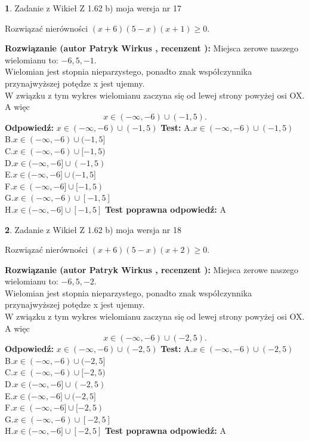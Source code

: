 \documentclass[12pt, a4paper]{article}
\theoremstyle{definition} %
\newtheorem{zad}{}
\newcommand{\zadStart}[1]{\begin{zad}#1\newline}
\newcommand{\zadStop}{\end{zad}}
\newcommand{\rozwStart}[2]{\noindent \textbf{Rozwiązanie (autor #1 , recenzent #2): }\newline}
\newcommand{\rozwStop}{\newline}
\newcommand{\odpStart}{\noindent \textbf{Odpowiedź:}\newline}
\newcommand{\odpStop}{\newline}
\newcommand{\testStart}{\noindent \textbf{Test:}\newline}
\newcommand{\testStop}{\newline}
\newcommand{\kluczStart}{\noindent \textbf{Test poprawna odpowiedź:}\newline}
\newcommand{\kluczStop}{\newline}
\begin{document}
\zadStart{Zadanie z Wikieł Z 1.62 b) moja wersja nr 17}

Rozwiązać nierówności $(x+6)(5-x)(x+1)\ge0$.
\zadStop
\rozwStart{Patryk Wirkus}{}
Miejsca zerowe naszego wielomianu to: $-6, 5, -1$.\\
Wielomian jest stopnia nieparzystego, ponadto znak współczynnika przy\linebreak najwyższej potędze x jest ujemny.\\ W związku z tym wykres wielomianu zaczyna się od lewej strony powyżej osi OX. A więc $$x \in (-\infty,-6) \cup (-1,5).$$
\rozwStop
\odpStart
$x \in (-\infty,-6) \cup (-1,5)$
\odpStop
\testStart
A.$x \in (-\infty,-6) \cup (-1,5)$\\
B.$x \in (-\infty,-6) \cup (-1,5]$\\
C.$x \in (-\infty,-6) \cup [-1,5)$\\
D.$x \in (-\infty,-6] \cup (-1,5)$\\
E.$x \in (-\infty,-6] \cup (-1,5]$\\
F.$x \in (-\infty,-6] \cup [-1,5)$\\
G.$x \in (-\infty,-6) \cup [-1,5]$\\
H.$x \in (-\infty,-6] \cup [-1,5]$
\testStop
\kluczStart
A
\kluczStop



\zadStart{Zadanie z Wikieł Z 1.62 b) moja wersja nr 18}

Rozwiązać nierówności $(x+6)(5-x)(x+2)\ge0$.
\zadStop
\rozwStart{Patryk Wirkus}{}
Miejsca zerowe naszego wielomianu to: $-6, 5, -2$.\\
Wielomian jest stopnia nieparzystego, ponadto znak współczynnika przy\linebreak najwyższej potędze x jest ujemny.\\ W związku z tym wykres wielomianu zaczyna się od lewej strony powyżej osi OX. A więc $$x \in (-\infty,-6) \cup (-2,5).$$
\rozwStop
\odpStart
$x \in (-\infty,-6) \cup (-2,5)$
\odpStop
\testStart
A.$x \in (-\infty,-6) \cup (-2,5)$\\
B.$x \in (-\infty,-6) \cup (-2,5]$\\
C.$x \in (-\infty,-6) \cup [-2,5)$\\
D.$x \in (-\infty,-6] \cup (-2,5)$\\
E.$x \in (-\infty,-6] \cup (-2,5]$\\
F.$x \in (-\infty,-6] \cup [-2,5)$\\
G.$x \in (-\infty,-6) \cup [-2,5]$\\
H.$x \in (-\infty,-6] \cup [-2,5]$
\testStop
\kluczStart
A
\kluczStop
\end{document}
